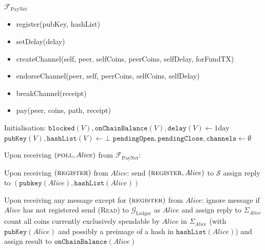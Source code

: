 \begin{functionality}{$\mathcal{F}_{\mathrm{PayNet}}$}
  \label{alg:payfunc}
    \begin{itemize}
      \item register(pubKey, hashList)
      \item setDelay(delay)
      \item createChannel(self, peer, selfCoins, peerCoins, selfDelay, forFundTX)
      \item endorseChannel(peer, self, peerCoins, selfCoins, selfDelay)
      \item breakChannel(receipt)
      \item pay(peer, coins, path, receipt)
    \end{itemize}

  \begin{algorithmic}[1]
    \State Initialisation:
      \Indent
        \State $\mathtt{blocked}\left(V\right),
        \mathtt{onChainBalance}\left(V\right), \mathtt{delay}\left(V\right)
        \gets 1\mathrm{day}$ 
        \State $\mathtt{pubKey}\left(V\right), \mathtt{hashList}\left(V\right)
        \gets \bot$
      \EndFor
      \State $\mathtt{pendingOpen}, \mathtt{pendingClose}, \mathtt{channels}
      \gets \emptyset$
      \EndIndent
    \State

    \State Upon receiving $\left(\textsc{poll}, Alice\right)$ from
    $\mathcal{F}_{\mathrm{PayNet}}$:
    \Indent
      \State {}
    \EndIndent
    \State

    \State Upon receiving $\left(\textsc{register}\right)$ from $Alice$:
    \Indent
      \State send $\left(\textsc{register}, Alice\right)$ to $\mathcal{S}$
      \State assign reply to $\left(\mathtt{pubkey}\left(Alice\right),
      \mathtt{hashList}\left(Alice\right)\right)$
    \EndIndent
    \State

    \State Upon receiving any message except for
    $\left(\textsc{register}\right)$ from $Alice$:
    \Indent
      \State ignore message if $Alice$ has not registered
      \State send (\textsc{Read}) to $\mathcal{G}_{\mathrm{Ledger}}$ as $Alice$
      and assign reply to $\Sigma_{Alice}$
      \State count all coins currently exclusively spendable by $Alice$ in
      $\Sigma_{Alice}$ (with $\mathtt{pubKey}\left(Alice\right)$ and possibly a
      preimage of a hash in $\mathtt{hashList}\left(Alice\right)$) and assign
      result to $\mathtt{onChainBalance}\left(Alice\right)$ 
    \EndIndent
    \State


\end{algorithmic}
\end{functionality}
